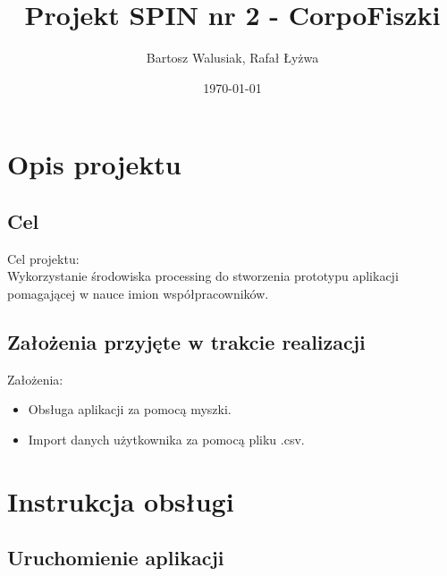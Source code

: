 \documentclass[11pt]{article}
\begin{document}
    \title{Projekt SPIN nr 2 - CorpoFiszki}
    \author{Bartosz Walusiak, Rafał Łyżwa}
    \date{\today}
    \maketitle

    \tableofcontents

    \newpage

    \section{Opis projektu}\label{sec:description}
    \subsection{Cel}\label{subsec:target}
    Cel projektu:\\
    Wykorzystanie środowiska processing do stworzenia prototypu aplikacji pomagającej w nauce imion współpracowników.

    \subsection{Założenia przyjęte w trakcie realizacji}\label{subsec:design-choices}
    Założenia:
    \begin{itemize}
        \item Obsługa aplikacji za pomocą myszki.
        \item Import danych użytkownika za pomocą pliku .csv.
    \end{itemize}

    \section{Instrukcja obsługi}\label{sec:user-manual}
    \subsection{Uruchomienie aplikacji}\label{subsec:setup}
\end{document}
